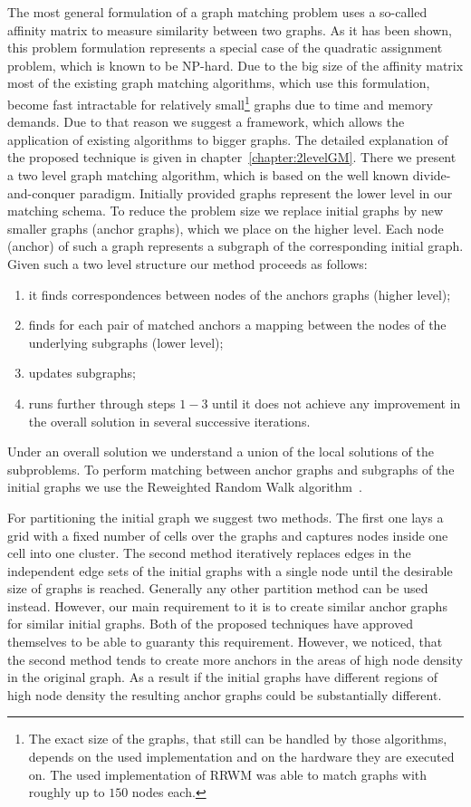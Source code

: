 The most general formulation of a graph matching problem uses a so-called affinity matrix to measure similarity between two graphs. 
As it has been shown, this problem formulation represents a special case of the quadratic assignment problem, which is known to be NP-hard. Due to the big size of the affinity matrix most of the existing graph matching algorithms, which use this formulation, become fast intractable for relatively small\footnote{The exact size of the graphs, that still can be handled by those algorithms, depends on the used implementation and on the hardware they are executed on. The used implementation of RRWM was able to match graphs with roughly up to $150$ nodes each.} graphs due to time and memory demands. Due to that reason we suggest a framework, which allows the application of existing algorithms to bigger graphs. The detailed explanation of the proposed technique is given in chapter~\ref{chapter:2levelGM}. There we present a two level graph matching algorithm, which is based on the well known divide-and-conquer paradigm. Initially provided graphs represent the lower level in our matching schema. To reduce the problem size we replace initial graphs by new smaller graphs (anchor graphs), which we place on the higher level. Each node (anchor) of such a graph represents a subgraph of the corresponding initial graph. Given such a two level structure our method proceeds as follows:
\begin{enumerate}
\item it finds correspondences between nodes of the anchors graphs (higher level);
\item finds for each pair of matched anchors a mapping between the nodes of the underlying subgraphs (lower level);
\item updates subgraphs;
\item runs further through steps $1-3$ until it does not achieve any improvement in the overall solution in several successive iterations.
\end{enumerate}
Under an overall solution we understand a union of the local solutions of the subproblems. To perform matching between anchor graphs and subgraphs of the initial graphs we use the Reweighted Random Walk algorithm~\cite{Cho2010_RRWM}.

For partitioning the initial graph we suggest two methods. The first one lays a grid with a fixed number of cells over the graphs and captures nodes inside one cell into one cluster. The second method iteratively replaces edges in the independent edge sets of the initial graphs with a single node until the desirable size of graphs is reached. Generally any other partition method can be used instead. However, our main requirement to it is to create similar anchor graphs for similar initial graphs. Both of the proposed techniques have approved themselves to be able to guaranty this requirement. However, we noticed, that the second method tends to create more anchors in the areas of high node density in the original graph. As a result if the initial graphs have different regions of high node density the resulting anchor graphs could be substantially different.

